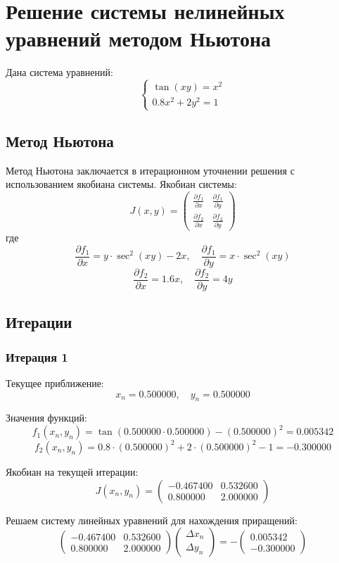 \documentclass{article}
\begin{document}
\section*{Решение системы нелинейных уравнений методом Ньютона}

Дана система уравнений:
\[
\begin{cases}
\tan(xy) = x^2 \\
0.8x^2 + 2y^2 = 1
\end{cases}
\]

\subsection*{Метод Ньютона}

Метод Ньютона заключается в итерационном уточнении решения с использованием якобиана системы. Якобиан системы:
\[
J(x, y) = \begin{pmatrix}
\frac{\partial f_1}{\partial x} & \frac{\partial f_1}{\partial y} \\
\frac{\partial f_2}{\partial x} & \frac{\partial f_2}{\partial y}
\end{pmatrix}
\]
где
\[
\frac{\partial f_1}{\partial x} = y \cdot \sec^2(xy) - 2x, \quad
\frac{\partial f_1}{\partial y} = x \cdot \sec^2(xy)
\]
\[
\frac{\partial f_2}{\partial x} = 1.6x, \quad
\frac{\partial f_2}{\partial y} = 4y
\]

\subsection*{Итерации}

\subsubsection*{Итерация 1}

Текущее приближение:
\[
x_n = 0.500000, \quad y_n = 0.500000
\]

Значения функций:
\[
f_1(x_n, y_n) = \tan(0.500000 \cdot 0.500000) - (0.500000)^2 = 0.005342
\]
\[
f_2(x_n, y_n) = 0.8 \cdot (0.500000)^2 + 2 \cdot (0.500000)^2 - 1 = -0.300000
\]

Якобиан на текущей итерации:
\[
J(x_n, y_n) = \begin{pmatrix}
-0.467400 & 0.532600 \\
0.800000 & 2.000000
\end{pmatrix}
\]

Решаем систему линейных уравнений для нахождения приращений:
\[
\begin{pmatrix}
-0.467400 & 0.532600 \\
0.800000 & 2.000000
\end{pmatrix}
\begin{pmatrix}
\Delta x_n \\
\Delta y_n
\end{pmatrix}
= -\begin{pmatrix}
0.005342 \\
-0.300000
\end{pmatrix}
\]
\end{document}
